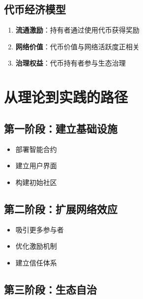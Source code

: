 \documentclass[
  Letterpaper,
]{scrbook}
\providecommand{\tightlist}{%
  \setlength{\itemsep}{0pt}\setlength{\parskip}{0pt}}
\begin{document}
\subsection{代币经济模型}\label{ux4ee3ux5e01ux7ecfux6d4eux6a21ux578b}

\begin{enumerate}
\def\labelenumi{\arabic{enumi}.}
\tightlist
\item
  \textbf{流通激励}：持有者通过使用代币获得奖励
\item
  \textbf{网络价值}：代币价值与网络活跃度正相关
\item
  \textbf{治理权益}：代币持有者参与生态治理
\end{enumerate}

\section{从理论到实践的路径}\label{ux4eceux7406ux8bbaux5230ux5b9eux8df5ux7684ux8defux5f84}

\subsection{第一阶段：建立基础设施}\label{ux7b2cux4e00ux9636ux6bb5ux5efaux7acbux57faux7840ux8bbeux65bd}

\begin{itemize}
\tightlist
\item
  部署智能合约
\item
  建立用户界面
\item
  构建初始社区
\end{itemize}

\subsection{第二阶段：扩展网络效应}\label{ux7b2cux4e8cux9636ux6bb5ux6269ux5c55ux7f51ux7edcux6548ux5e94}

\begin{itemize}
\tightlist
\item
  吸引更多参与者
\item
  优化激励机制
\item
  建立信任体系
\end{itemize}

\subsection{第三阶段：生态自治}\label{ux7b2cux4e09ux9636ux6bb5ux751fux6001ux81eaux6cbb}
\end{document}
